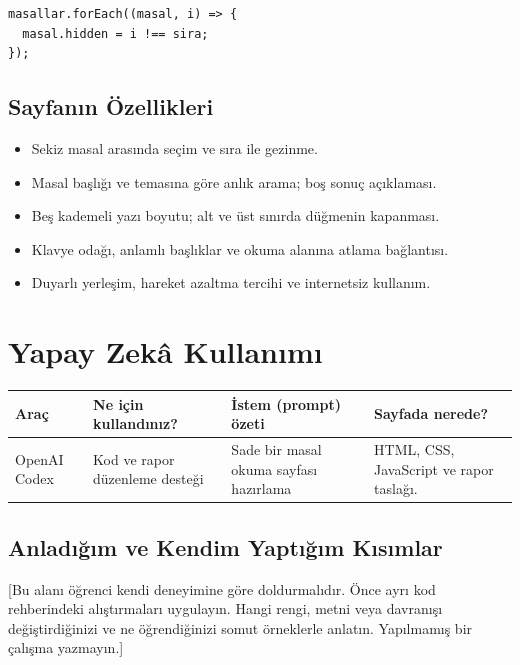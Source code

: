 \documentclass[12pt,a4paper]{article}
\begin{document}
\begin{lstlisting}[caption={İçsel JavaScript'ten önemli bir bölüm}]
masallar.forEach((masal, i) => {
  masal.hidden = i !== sira;
});
\end{lstlisting}

\subsection{Sayfanın Özellikleri}
\begin{itemize}
\item Sekiz masal arasında seçim ve sıra ile gezinme.
\item Masal başlığı ve temasına göre anlık arama; boş sonuç açıklaması.
\item Beş kademeli yazı boyutu; alt ve üst sınırda düğmenin kapanması.
\item Klavye odağı, anlamlı başlıklar ve okuma alanına atlama bağlantısı.
\item Duyarlı yerleşim, hareket azaltma tercihi ve internetsiz kullanım.
\end{itemize}


\section{Yapay Zekâ Kullanımı}


\begin{longtable}{@{}p{2.6cm}p{3.6cm}p{4.2cm}p{3.4cm}@{}}
\toprule
\textbf{Araç} & \textbf{Ne için kullandınız?} & \textbf{İstem (prompt) özeti} & \textbf{Sayfada nerede?} \\
\midrule
\endhead
OpenAI Codex & Kod ve rapor düzenleme desteği & Sade bir masal okuma sayfası hazırlama & HTML, CSS, JavaScript ve rapor taslağı. \\
\bottomrule
\end{longtable}

\subsection{Anladığım ve Kendim Yaptığım Kısımlar}
[Bu alanı öğrenci kendi deneyimine göre doldurmalıdır. Önce ayrı kod rehberindeki
alıştırmaları uygulayın. Hangi rengi, metni veya davranışı değiştirdiğinizi ve
ne öğrendiğinizi somut örneklerle anlatın. Yapılmamış bir çalışma yazmayın.]

\end{document}
